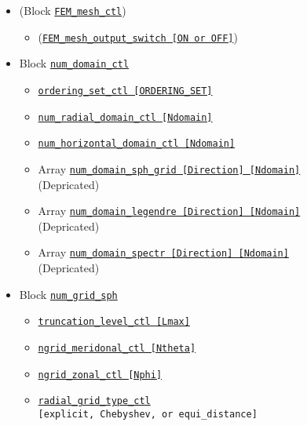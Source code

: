 		\begin{itemize}
		\item (Block \hyperref[href_t:FEM_mesh_ctl]{\tt FEM\_mesh\_ctl})
		\begin{itemize} \label{href_i:FEM_mesh_ctl}
		\item (\hyperref[href_t:FEM_mesh_output_switch]{\tt FEM\_mesh\_output\_switch [ON or OFF]})
		\end{itemize}
%
		\item Block \hyperref[href_t:num_domain_ctl]{\tt num\_domain\_ctl}
			\begin{itemize} \label{href_i:num_domain_ctl}
			\item \hyperref[href_t:ordering_set_ctl]{\tt ordering\_set\_ctl [ORDERING\_SET]}

			\item \hyperref[href_t:num_radial_domain_ctl]{\tt num\_radial\_domain\_ctl [Ndomain]}
			\item \hyperref[href_t:num_horizontal_domain_ctl]{\tt num\_horizontal\_domain\_ctl [Ndomain]}
%
            		\item {\color{magenta} Array \hyperref[href_t:num_domain_sph_grid]
				{\tt num\_domain\_sph\_grid    [Direction]    [Ndomain]} \\
				(Depricated)}
			\item {\color{magenta} Array \hyperref[href_t:num_domain_legendre]
				{\tt num\_domain\_legendre    [Direction]    [Ndomain]} \\
				(Depricated)}
			\item {\color{magenta} Array \hyperref[href_t:num_domain_spectr]
				{\tt num\_domain\_spectr      [Direction]    [Ndomain]} \\
				(Depricated)}
			\end{itemize}
%
		\item Block \hyperref[href_t:num_grid_sph]{\tt num\_grid\_sph}
			\begin{itemize} \label{href_i:num_grid_sph}
	        \item \hyperref[href_t:truncation_level_ctl]{\tt truncation\_level\_ctl	[Lmax]}
			\item \hyperref[href_t:ngrid_meridonal_ctl]{\tt ngrid\_meridonal\_ctl [Ntheta]}
			\item \hyperref[href_t:ngrid_zonal_ctl]{\tt ngrid\_zonal\_ctl [Nphi]}
%
			\item \hyperref[href_t:radial_grid_type_ctl]{\tt radial\_grid\_type\_ctl} \\
				\verb|[explicit, Chebyshev, or equi_distance]| \label{href_i:radial_grid_type_ctl}

\end{itemize}
\end{itemize}

